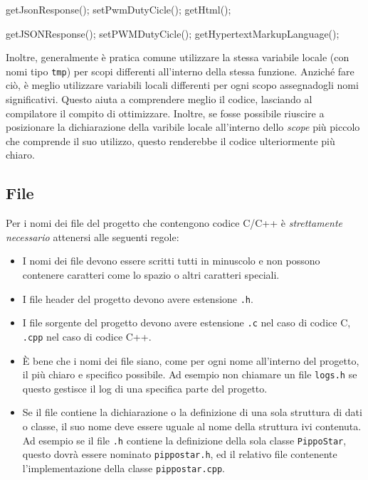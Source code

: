 \begin{minipage}[t]{\cbwidth}
\begin{RightCode}
getJsonResponse();
setPwmDutyCicle();
getHtml();
\end{RightCode}
\end{minipage}%
\hspace{\cbdistance}
\begin{minipage}[t]{\cbwidth}
\begin{ErrorCode}
getJSONResponse();
setPWMDutyCicle();
getHypertextMarkupLanguage();
\end{ErrorCode}
\end{minipage}

Inoltre, generalmente è pratica comune utilizzare la stessa variabile locale (con nomi tipo \texttt{tmp}) per scopi differenti all'interno della stessa funzione.
Anziché fare ciò, è meglio utilizzare variabili locali differenti per ogni scopo assegnadogli nomi significativi.
Questo aiuta a comprendere meglio il codice, lasciando al compilatore il compito di ottimizzare.
Inoltre, se fosse possibile riuscire a posizionare la dichiarazione della varibile locale all'interno dello \emph{scope} più piccolo che comprende il suo utilizzo, questo renderebbe il codice ulteriormente più chiaro.

\subsection{File}\label{ssec:filename}

Per i nomi dei file del progetto che contengono codice C/C++ è \emph{strettamente necessario} attenersi alle seguenti regole:
\begin{itemize}
	\item I nomi dei file devono essere scritti tutti in minuscolo e non possono contenere caratteri come lo spazio o altri caratteri speciali.
	\item I file header del progetto devono avere estensione \texttt{.h}.
	\item I file sorgente del progetto devono avere estensione \texttt{.c} nel caso di codice C, \texttt{.cpp} nel caso di codice C++.
	\item È bene che i nomi dei file siano, come per ogni nome all'interno del progetto, il più chiaro e specifico possibile.
		Ad esempio non chiamare un file \texttt{logs.h} se questo gestisce il log di una specifica parte del progetto.
	\item Se il file contiene la dichiarazione o la definizione di una sola struttura di dati o classe, il suo nome deve essere uguale al nome della struttura ivi contenuta.
		Ad esempio se il file \texttt{.h} contiene la definizione della sola classe \texttt{PippoStar}, questo dovrà essere nominato \texttt{pippostar.h}, ed il relativo file contenente l'implementazione della classe \texttt{pippostar.cpp}. 
\end{itemize}

